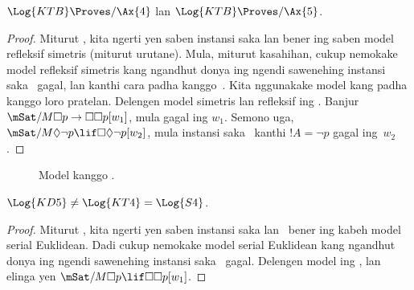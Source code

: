 \documentclass[../../../include/open-logic-section]{subfiles}
\begin{document}
\begin{thm}
  $\Log{KTB} \Proves/ \Ax{4}$ lan $\Log{KTB} \Proves/ \Ax{5}$.
\end{thm}

\begin{proof}
  Miturut , kita ngerti yen saben instansi
  saka  lan  bener ing saben model refleksif simetris
  (miturut urutane). Mula, miturut kasahihan, cukup nemokake model
  refleksif simetris kang ngandhut donya ing ngendi sawenehing instansi
  saka~ gagal, lan kanthi cara padha kanggo~. Kita nggunakake
  model kang padha kanggo loro pratelan. Delengen model simetris lan
  refleksif ing . Banjur $\mSat/{M}{\Box p \to \Box \Box
    p}[w_1]$, mula  gagal ing $w_1$. Semono uga, $\mSat/{M}{\Diamond
    \lnot p \lif \Box \Diamond \lnot p}[w_2]$, mula instansi
  saka~ kanthi $!A = \lnot p$ gagal ing~$w_2$.
\end{proof}

\begin{figure}[htpb]
  \centering
  \caption{Model kanggo .}
\end{figure}

\begin{thm}
  $\Log{KD5} \neq \Log{KT4} = \Log{S4}$.
\end{thm}

\begin{proof}
  Miturut , kita ngerti yen saben instansi
  saka  lan~ bener ing kabeh model serial Euklidean.
  Dadi cukup nemokake model serial Euklidean kang ngandhut donya
  ing ngendi sawenehing instansi saka~ gagal. Delengen model ing
  , lan elinga yen $\mSat/{M}{\Box p
  \lif \Box\Box p}[w_1]$.
\end{proof}
\end{document}
